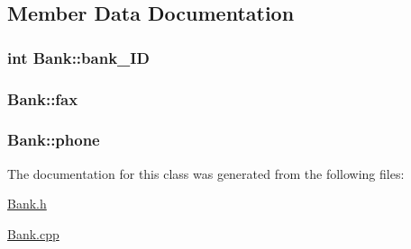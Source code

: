 \subsection{Member Data Documentation}
\hypertarget{classBank_a06dfa13f15b434d0bd135229d8b71843}{
\subsubsection[{bank\+\_\+\+I\+D}]{\setlength{\rightskip}{0pt plus 5cm}int Bank\+::bank\+\_\+\+I\+D\hspace{0.3cm}{\ttfamily [private]}}}\label{classBank_a06dfa13f15b434d0bd135229d8b71843}
\hypertarget{classBank_a2289ec7adf9926d419db85a706d5e7d9}{
\subsubsection[{fax}]{ Bank\+::fax\hspace{0.3cm}{\ttfamily [private]}}}\label{classBank_a2289ec7adf9926d419db85a706d5e7d9}
\hypertarget{classBank_a27aa9c6b6d1884365910d118dcf2b5c6}{
\subsubsection[{phone}]{ Bank\+::phone\hspace{0.3cm}{\ttfamily [private]}}}\label{classBank_a27aa9c6b6d1884365910d118dcf2b5c6}


The documentation for this class was generated from the following files\+:\begin{DoxyCompactItemize}
\item 
\hyperlink{Bank_8h}{Bank.\+h}\item 
\hyperlink{Bank_8cpp}{Bank.\+cpp}\end{DoxyCompactItemize}
